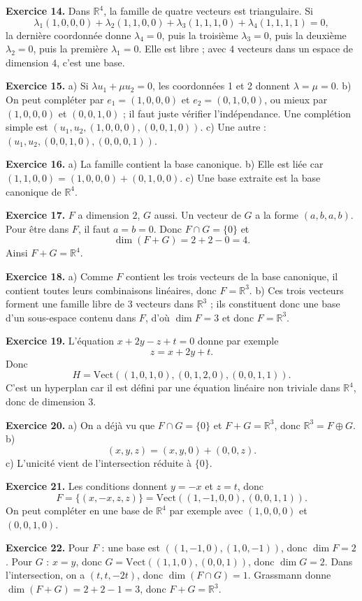 \documentclass[11pt,a4paper]{article}
\newcommand{\R}{\mathbb R}
\newcommand{\Vect}{\mathrm{Vect}}
\begin{document}
\textbf{Exercice 14.} Dans $\R^4$, la famille de quatre vecteurs est triangulaire. Si
\[\lambda_1(1,0,0,0)+\lambda_2(1,1,0,0)+\lambda_3(1,1,1,0)+\lambda_4(1,1,1,1)=0,
\]
la dernière coordonnée donne $\lambda_4=0$, puis la troisième $\lambda_3=0$, puis la deuxième $\lambda_2=0$, puis la première $\lambda_1=0$. Elle est libre ; avec $4$ vecteurs dans un espace de dimension $4$, c'est une base.

\textbf{Exercice 15.} a) Si $\lambda u_1+\mu u_2=0$, les coordonnées 1 et 2 donnent $\lambda=\mu=0$. b) On peut compléter par $e_1=(1,0,0,0)$ et $e_2=(0,1,0,0)$, ou mieux par $(1,0,0,0)$ et $(0,0,1,0)$ ; il faut juste vérifier l'indépendance. Une complétion simple est $(u_1,u_2,(1,0,0,0),(0,0,1,0))$. c) Une autre : $(u_1,u_2,(0,0,1,0),(0,0,0,1))$.

\textbf{Exercice 16.} a) La famille contient la base canonique. b) Elle est liée car $(1,1,0,0)=(1,0,0,0)+(0,1,0,0)$. c) Une base extraite est la base canonique de $\R^4$.

\textbf{Exercice 17.} $F$ a dimension $2$, $G$ aussi. Un vecteur de $G$ a la forme $(a,b,a,b)$. Pour être dans $F$, il faut $a=b=0$. Donc $F\cap G=\{0\}$ et
\[\dim(F+G)=2+2-0=4.\]
Ainsi $F+G=\R^4$.

\textbf{Exercice 18.} a) Comme $F$ contient les trois vecteurs de la base canonique, il contient toutes leurs combinaisons linéaires, donc $F=\R^3$. b) Ces trois vecteurs forment une famille libre de $3$ vecteurs dans $\R^3$ ; ils constituent donc une base d'un sous-espace contenu dans $F$, d'où $\dim F=3$ et donc $F=\R^3$.

\textbf{Exercice 19.} L'équation $x+2y-z+t=0$ donne par exemple
\[z=x+2y+t.
\]
Donc
\[H=\Vect((1,0,1,0),(0,1,2,0),(0,0,1,1)).\]
C'est un hyperplan car il est défini par une équation linéaire non triviale dans $\R^4$, donc de dimension $3$.

\textbf{Exercice 20.} a) On a déjà vu que $F\cap G=\{0\}$ et $F+G=\R^3$, donc $\R^3=F\oplus G$. b) 
\[(x,y,z)=(x,y,0)+(0,0,z).\]
 c) L'unicité vient de l'intersection réduite à $\{0\}$.

\textbf{Exercice 21.} Les conditions donnent $y=-x$ et $z=t$, donc
\[F=\{(x,-x,z,z)\}=\Vect((1,-1,0,0),(0,0,1,1)).\]
On peut compléter en une base de $\R^4$ par exemple avec $(1,0,0,0)$ et $(0,0,1,0)$.

\textbf{Exercice 22.} Pour $F$ : une base est $((1,-1,0),(1,0,-1))$, donc $\dim F=2$. Pour $G$ : $x=y$, donc $G=\Vect((1,1,0),(0,0,1))$, donc $\dim G=2$. Dans l'intersection, on a $(t,t,-2t)$, donc $\dim(F\cap G)=1$. Grassmann donne $\dim(F+G)=2+2-1=3$, donc $F+G=\R^3$.
\end{document}
